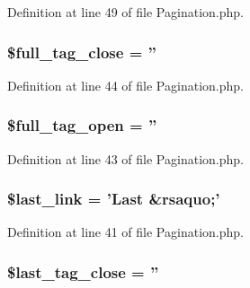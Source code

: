Definition at line 49 of file Pagination.\-php.

\hypertarget{class_c_i___pagination_ad7e8fd7ace07539860b6f0b323aacbc8}{
\subsubsection[{\$full\-\_\-tag\-\_\-close}]{\setlength{\rightskip}{0pt plus 5cm}\$full\-\_\-tag\-\_\-close = ''}}\label{class_c_i___pagination_ad7e8fd7ace07539860b6f0b323aacbc8}


Definition at line 44 of file Pagination.\-php.

\hypertarget{class_c_i___pagination_a75336a53727415578f78bd3d337c8559}{
\subsubsection[{\$full\-\_\-tag\-\_\-open}]{\setlength{\rightskip}{0pt plus 5cm}\$full\-\_\-tag\-\_\-open = ''}}\label{class_c_i___pagination_a75336a53727415578f78bd3d337c8559}


Definition at line 43 of file Pagination.\-php.

\hypertarget{class_c_i___pagination_ab10d1c6de63d2bc11a210c26e450b231}{
\subsubsection[{\$last\-\_\-link}]{\setlength{\rightskip}{0pt plus 5cm}\$last\-\_\-link = 'Last \&rsaquo;'}}\label{class_c_i___pagination_ab10d1c6de63d2bc11a210c26e450b231}


Definition at line 41 of file Pagination.\-php.

\hypertarget{class_c_i___pagination_a8e024740710598d97da42739bd231dda}{
\subsubsection[{\$last\-\_\-tag\-\_\-close}]{\setlength{\rightskip}{0pt plus 5cm}\$last\-\_\-tag\-\_\-close = ''}}\label{class_c_i___pagination_a8e024740710598d97da42739bd231dda}


